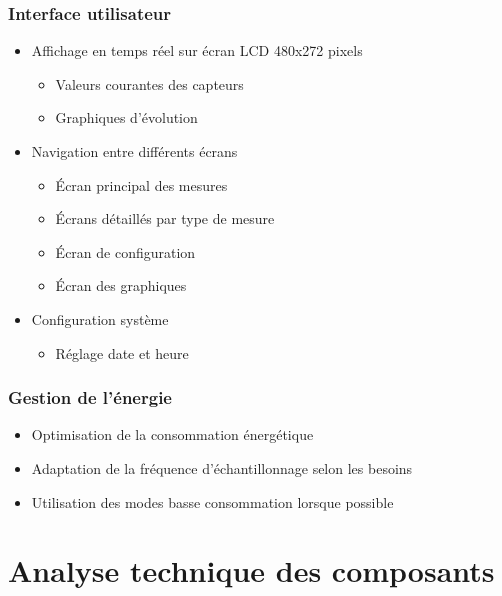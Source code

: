 \documentclass[12pt]{article}
\begin{document}
\subsubsection{Interface utilisateur}
\begin{itemize}
    \item Affichage en temps réel sur écran LCD 480x272 pixels
    \begin{itemize}
        \item Valeurs courantes des capteurs
        \item Graphiques d'évolution
    \end{itemize}
    \item Navigation entre différents écrans
    \begin{itemize}
        \item Écran principal des mesures
        \item Écrans détaillés par type de mesure
        \item Écran de configuration
        \item Écran des graphiques
    \end{itemize}
    \item Configuration système
    \begin{itemize}
        \item Réglage date et heure
    \end{itemize}
\end{itemize}

\subsubsection{Gestion de l'énergie}
\begin{itemize}
    \item Optimisation de la consommation énergétique
    \item Adaptation de la fréquence d'échantillonnage selon les besoins
    \item Utilisation des modes basse consommation lorsque possible
\end{itemize}


\section{Analyse technique des composants}
\end{document}
